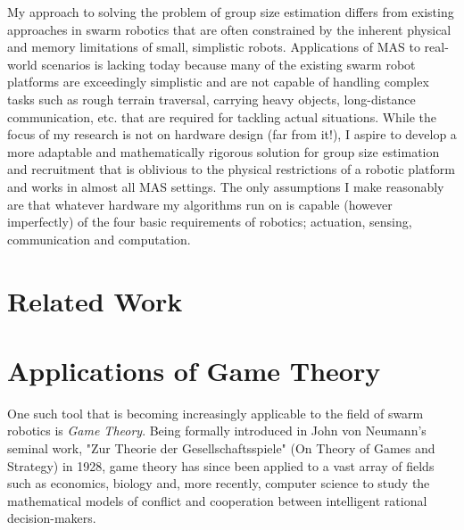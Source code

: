 \documentclass[11pt, onecolumn, compsoc, letterpaper]{article}
\begin{document}
My approach to solving the problem of group size estimation differs from existing approaches in swarm robotics that are often constrained by the inherent physical and memory limitations of small, simplistic robots. Applications of MAS to real-world scenarios is lacking today because many of the existing swarm robot platforms are exceedingly simplistic and are not capable of handling complex tasks such as rough terrain traversal, carrying heavy objects, long-distance communication, etc. that are required for tackling actual situations. While the focus of my research is not on hardware design (far from it!), I aspire to develop a more adaptable and mathematically rigorous solution for group size estimation and recruitment that is oblivious to the physical restrictions of a robotic platform and works in almost all MAS settings. The only assumptions I make reasonably are that whatever hardware my algorithms run on is capable (however imperfectly) of the four basic requirements of robotics; actuation, sensing, communication and computation.

\section{Related Work}


\section{Applications of Game Theory}
One such tool that is becoming increasingly applicable to the field of swarm robotics is \emph{Game Theory}. Being formally introduced in John von Neumann's seminal work, "Zur Theorie der Gesellschaftsspiele" (On Theory of Games and Strategy) in 1928, game theory has since been applied to a vast array of fields such as economics, biology and, more recently, computer science to study the mathematical models of conflict and cooperation between intelligent rational decision-makers.

%


\end{document}
